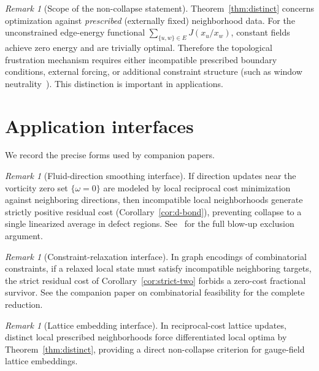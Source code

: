 \documentclass[11pt]{amsart}
\theoremstyle{definition}
\theoremstyle{remark}
\newtheorem{remark}[theorem]{Remark}
\begin{document}
\begin{remark}[Scope of the non-collapse statement]\label{rem:scope}
Theorem~\ref{thm:distinct} concerns optimization against
\emph{prescribed} (externally fixed) neighborhood data.
For the unconstrained edge-energy functional
$\sum_{\{u,w\}\in E}J(x_u/x_w)$, constant fields achieve zero energy
and are trivially optimal.
Therefore the topological frustration mechanism requires either
incompatible prescribed boundary conditions, external forcing, or
additional constraint structure (such as window neutrality~\cite{F3}).
This distinction is important in applications.
\end{remark}

\section{Application interfaces}\label{sec:apps}

We record the precise forms used by companion papers.

\begin{remark}[Fluid-direction smoothing interface]\label{rem:fluid}
If direction updates near the vorticity zero set $\{\omega=0\}$ are
modeled by local reciprocal cost minimization against neighboring
directions, then incompatible local neighborhoods generate strictly
positive residual cost (Corollary~\ref{cor:d-bond}), preventing
collapse to a single linearized average in defect regions.
See~\cite{F6} for the full blow-up exclusion argument.
\end{remark}

\begin{remark}[Constraint-relaxation interface]\label{rem:constraint}
In graph encodings of combinatorial constraints, if a relaxed local
state must satisfy incompatible neighboring targets, the strict residual
cost of Corollary~\ref{cor:strict-two} forbids a zero-cost fractional
survivor.  See the companion paper on combinatorial feasibility for the
complete reduction.
\end{remark}

\begin{remark}[Lattice embedding interface]\label{rem:lattice}
In reciprocal-cost lattice updates, distinct local prescribed
neighborhoods force differentiated local optima by
Theorem~\ref{thm:distinct}, providing a direct non-collapse criterion
for gauge-field lattice embeddings.
\end{remark}
\end{document}
